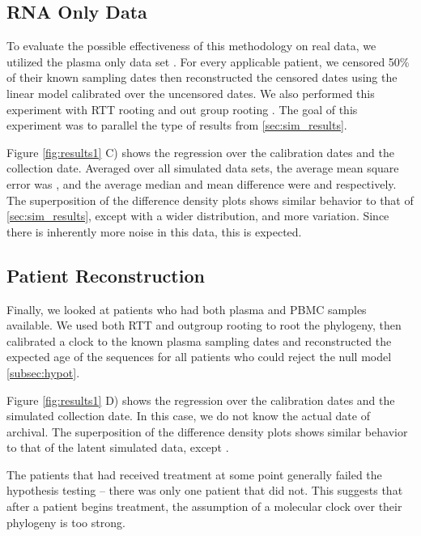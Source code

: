 \subsection{RNA Only Data} \label{sec:rna_only}
To evaluate the possible effectiveness of this methodology on real data, we utilized the plasma only data set \citep{McCloskey14}. For every applicable patient, we censored 50\% of their known sampling dates then reconstructed the censored dates using the linear model calibrated over the uncensored dates. We also performed this experiment with RTT rooting and out group rooting . The goal of this experiment was to parallel the type of results from \ref{sec:sim_results}.

Figure \ref{fig:results1} C) shows the regression over the calibration dates and the collection date. Averaged over all simulated data sets, the average mean square error was , and the average median and mean difference were  and  respectively. The superposition of the difference density plots shows similar behavior to that of \ref{sec:sim_results}, except with a wider distribution, and more variation. Since there is inherently more noise in this data, this is expected. 

\subsection{Patient Reconstruction}
Finally, we looked at patients who had both plasma and PBMC samples available. We used both RTT and outgroup rooting to root the phylogeny, then calibrated a clock to the known plasma sampling dates and reconstructed the expected age of the sequences for all patients who could reject the null model \ref{subsec:hypot}. 

Figure \ref{fig:results1} D) shows the regression over the calibration dates and the simulated collection date. In this case, we do not know the actual date of archival.  The superposition of the difference density plots shows similar behavior to that of the latent simulated data, except .

The patients that had received treatment at some point generally failed the hypothesis testing -- there was only one patient that did not. This suggests that after a patient begins treatment, the assumption of a molecular clock over their phylogeny is too strong. 
